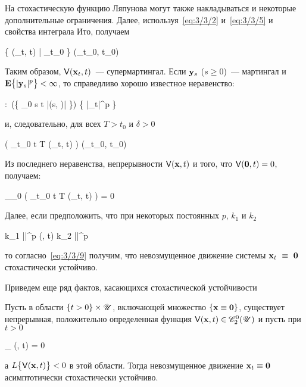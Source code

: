 На стохастическую функцию Ляпунова могут также накладываться и некоторые дополнительные ограничения. Далее, используя~\ref{eq:3/3/2} и~\ref{eq:3/3/5} и свойства интеграла Ито, получаем

    \E \bigl\{ \funcV(_t, t) \bigm| \funcF_{t_0} \bigr\} \leqslant \funcV(_{t_0}, t_0) 
\eeq

Таким образом, $\mathsf{V}(\mathbf{x}_t, t)$~--- супермартингал. Если $\mathbf{y}_s$ ($s \geqslant 0$)~--- мартингал и $\mathbf{E} \bigl\{ |\mathbf{y}_s|^p \bigr\} < \infty$, то справедливо хорошо известное неравенство:

    \forall \alpha:~\prob\Biggl(\bigl\{ \omega \in \Omega \colon \sup\limits_{0 \leqslant s \leqslant t} |(s, \omega)| \geqslant \alpha \bigr\}\Biggr) \leqslant {} \E \bigl\{ |_t|^p \bigr\}
\eeq

и, следовательно, для всех $T > t_0$ и $\delta > 0$

    \prob\Biggl( \sup\limits_{t_0 \leqslant t \leqslant T} \funcV(_t, t) \geqslant \delta \Biggr) \leqslant {} \funcV(_{t_0}, t_0) 
\eeq

Из последнего неравенства, непрерывности $\mathsf{V}(\mathbf{x}, t)$ и того, что $\mathsf{V}(\mathbf{0}, t) = 0$, получаем:

    \lim\limits_{_0 \to {}} \prob\Biggl( \sup\limits_{t_0 \leqslant t \leqslant T} \funcV(_t, t) \geqslant \delta \Biggr) = 0 
\eeq

Далее, если предположить, что при некоторых постоянных $p$, $k_1$ и $k_2$

    k_1 ||^p \leqslant \funcV(, t) \leqslant k_2 ||^p \text{,}
\eeq

то согласно~\ref{eq:3/3/9} получим, что невозмущенное движение системы $\mathbf{x}_t~\equiv~\mathbf{0}$ стохастически устойчиво.

\br

Приведем еще ряд фактов\cite{HASMINSKI}, касающихся стохастической устойчивости

    Пусть в области $\{ t > 0 \} \times \mathscr{U}$, включающей множество $\{ \mathbf{x} \equiv \mathbf{0} \}$, существует непрерывная, положительно определенная функция $\mathsf{V}(\mathbf{x}, t) \in \mathscr{C}_2^0(\mathscr{U})$ и пусть при $t > 0$

        \beqn
            \limsup\limits_{ \to {}} \funcV(, t) = 0 \text{,}
        \eeqn

        а $L\bigl\{ \mathsf{V}(\mathbf{x}, t) \bigr\} < 0$ в этой области. Тогда невозмущенное движение $\mathbf{x}_t \equiv \mathbf{0}$ асимптотически стохастически устойчиво.
\eteo

